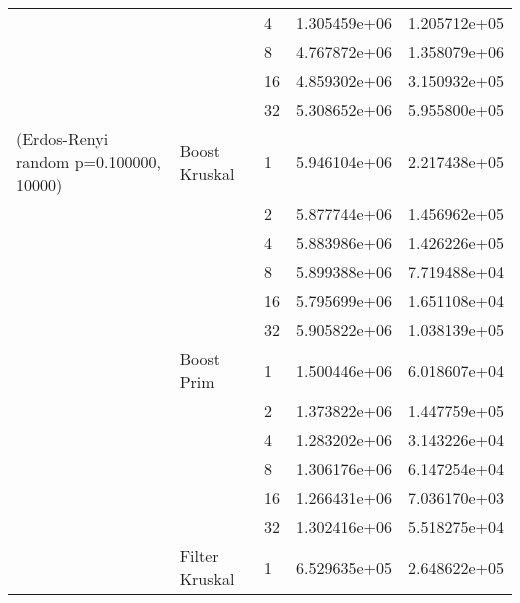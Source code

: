 \begin{tabular}{lllrr}
                                                       &                     & 4  &  1.305459e+06 &  1.205712e+05 \\
                                                       &                     & 8  &  4.767872e+06 &  1.358079e+06 \\
                                                       &                     & 16 &  4.859302e+06 &  3.150932e+05 \\
                                                       &                     & 32 &  5.308652e+06 &  5.955800e+05 \\
(Erdos-Renyi random p=0.100000, 10000) & Boost Kruskal & 1  &  5.946104e+06 &  2.217438e+05 \\
                                                       &                     & 2  &  5.877744e+06 &  1.456962e+05 \\
                                                       &                     & 4  &  5.883986e+06 &  1.426226e+05 \\
                                                       &                     & 8  &  5.899388e+06 &  7.719488e+04 \\
                                                       &                     & 16 &  5.795699e+06 &  1.651108e+04 \\
                                                       &                     & 32 &  5.905822e+06 &  1.038139e+05 \\
                                                       & Boost Prim & 1  &  1.500446e+06 &  6.018607e+04 \\
                                                       &                     & 2  &  1.373822e+06 &  1.447759e+05 \\
                                                       &                     & 4  &  1.283202e+06 &  3.143226e+04 \\
                                                       &                     & 8  &  1.306176e+06 &  6.147254e+04 \\
                                                       &                     & 16 &  1.266431e+06 &  7.036170e+03 \\
                                                       &                     & 32 &  1.302416e+06 &  5.518275e+04 \\
                                                       & Filter Kruskal & 1  &  6.529635e+05 &  2.648622e+05 \\

\end{tabular}
